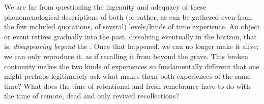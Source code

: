 \pa\label{pa:twoTimes}
We are far from questioning the ingenuity and adequacy of these 
phenomenological descriptions of both (or rather, as can be gathered even from the
few included quotations, of several) levels/kinds of time experience.
%
An  {object} or event retires gradually
into the past, 
 dissolving eventually in the horizon, that
is, {\em disappearing beyond} the \hoa. Once that happened, we can no longer
make it  
alive; we can only reproduce it, as if recalling it from beyond the grave. This
broken continuity makes the two kinds of experiences so fundamentally different
that one might perhaps legitimately ask what makes them both experiences of the
same time? What does the time of retentional  and fresh remebrance
have to do with the
time of remote, dead and only revived recollections?

